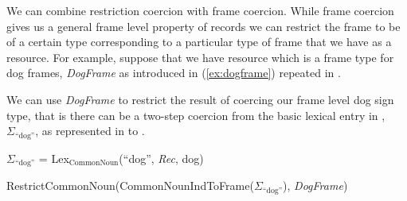 We can combine restriction coercion with frame coercion.  While frame
coercion gives us a general frame level property of records we can
restrict the frame to be of a certain type corresponding to a
particular type of frame that we have as a resource.  For example,
suppose that we have resource which is a frame type for dog frames, \textit{DogFrame} as introduced in
(\ref{ex:dogframe}) repeated in \nexteg{}.
\begin{ex} 
\end{ex} 
We can use \textit{DogFrame} to restrict the result of coercing our
frame level dog sign type, that is there can be a two-step coercion
from the basic lexical entry in , $\Sigma_{\text{``dog''}}$, as represented
in  to .
\begin{ex}
  \begin{subex} 
 
\item  $\Sigma_{\text{``dog''}}$ = Lex$_{\text{CommonNoun}}$(``dog'', \textit{Rec}, dog)
 
\item
  RestrictCommonNoun(CommonNounIndToFrame($\Sigma_{\text{``dog''}}$), \textit{DogFrame}) 
 
\end{subex} 
  
\end{ex} 




